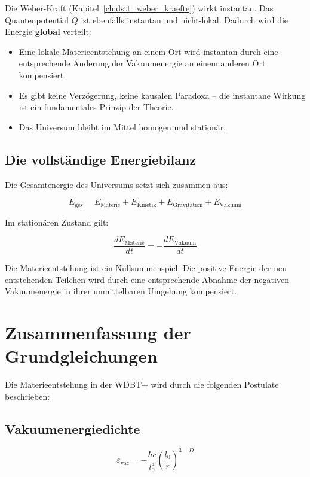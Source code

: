 Die Weber-Kraft (Kapitel~\ref{ch:dstt_weber_kraefte}) wirkt instantan. Das Quantenpotential \( Q \) ist ebenfalls instantan und nicht-lokal. Dadurch wird die Energie \textbf{global} verteilt:

\begin{itemize}
    \item Eine lokale Materieentstehung an einem Ort wird instantan durch eine entsprechende Änderung der Vakuumenergie an einem anderen Ort kompensiert.
    \item Es gibt keine Verzögerung, keine kausalen Paradoxa – die instantane Wirkung ist ein fundamentales Prinzip der Theorie.
    \item Das Universum bleibt im Mittel homogen und stationär.
\end{itemize}

\subsection{Die vollständige Energiebilanz}
\label{sub:materieentstehung_bilanz}

Die Gesamtenergie des Universums setzt sich zusammen aus:

\[
E_{\text{ges}} = E_{\text{Materie}} + E_{\text{Kinetik}} + E_{\text{Gravitation}} + E_{\text{Vakuum}}
\]

Im stationären Zustand gilt:

\[
\frac{dE_{\text{Materie}}}{dt} = -\frac{dE_{\text{Vakuum}}}{dt}
\]

Die Materieentstehung ist ein Nullsummenspiel: Die positive Energie der neu entstehenden Teilchen wird durch eine entsprechende Abnahme der negativen Vakuumenergie in ihrer unmittelbaren Umgebung kompensiert.

\section{Zusammenfassung der Grundgleichungen}
\label{app:materieentstehung_grundgleichungen}

Die Materieentstehung in der WDBT+ wird durch die folgenden Postulate beschrieben:

\subsection{Vakuumenergiedichte}

\[
\boxed{\varepsilon_{\text{vac}} = -\frac{\hbar c}{l_0^4} \left( \frac{l_0}{r} \right)^{3-D}}
\]

